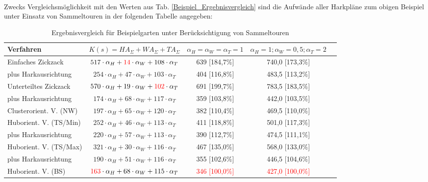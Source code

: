 \phantom \\ \noindent
Zwecks Vergleichsmöglichkeit mit den Werten aus Tab. \ref{Beispiel_Ergebnisvergleich}  sind die Aufwände aller Harkpläne zum obigen Beispiel unter Einsatz von Sammeltouren in der folgenden Tabelle angegeben:

\begin{center}
\begin{minipage}{\textwidth}
\renewcommand{\arraystretch}{1.5}
\begin{table}[H]
\caption{Ergebnisvergleich für Beispielgarten unter Berücksichtigung von Sammeltouren}
\begin{scriptsize}
\begin{tabular}{|l|c|c|c|c|}
\hline
Verfahren&$K(s)=HA_{\Sigma}+WA_{\Sigma}+TA_{\Sigma}$&$\alpha_H=\alpha_W=\alpha_T=1$&$\alpha_H=1;\alpha_W=0,5;\alpha_T=2$ \\
\hline \hline
Einfaches Zickzack&$517\cdot \alpha_H+\textcolor{red}{14}\cdot \alpha_W+108\cdot \alpha_T$&639 [184,7\%]&740,0 [173,3\%]\\
\hline
plus Harkausrichtung&$254\cdot \alpha_H+47\cdot \alpha_W+103\cdot \alpha_T$&404 [116,8\%]&483,5 [113,2\%]\\
\hline
Unterteiltes Zickzack&$570\cdot \alpha_H+19\cdot \alpha_W+\textcolor{red}{102}\cdot \alpha_T$&691 [199,7\%]&783,5 [183,5\%]\\
\hline
plus Harkausrichtung&$174\cdot \alpha_H+68\cdot \alpha_W+117\cdot \alpha_T$&359 [103,8\%]&442,0 [103,5\%]\\
\hline
Clusterorient. V. (NW) &$197\cdot \alpha_H+65\cdot \alpha_W+120\cdot \alpha_T$&382 [110,4\%]&469,5 [110,0\%]\\
\hline
Huborient. V. (TS/Min)&$252\cdot \alpha_H+46\cdot \alpha_W+113\cdot \alpha_T$&411 [118,8\%]&501,0 [117,3\%]\\
\hline
plus Harkausrichtung&$220\cdot \alpha_H+57\cdot \alpha_W+113\cdot \alpha_T$&390 [112,7\%]&474,5 [111,1\%]\\
\hline
Huborient. V. (TS/Max)&$321\cdot \alpha_H+30\cdot \alpha_W+116\cdot \alpha_T$&467 [135,0\%]&568,0 [133,0\%]\\
\hline
plus Harkausrichtung&$190\cdot \alpha_H+51\cdot \alpha_W+116\cdot \alpha_T$&355 [102,6\%]&446,5 [104,6\%]\\
\hline
Huborient. V. (BS) &$\textcolor{red}{163}\cdot \alpha_H+68\cdot \alpha_W+115\cdot \alpha_T$&\textcolor{red}{346 [100,0\%]}&\textcolor{red}{427,0 [100,0\%]}\\
\hline
\end{tabular}
\label{Beispiel_Ergebnisvergleich_mit Sammeltouren}
\end{scriptsize} 
\end{table}
\renewcommand{\arraystretch}{1}
\end{minipage}
\end{center}

